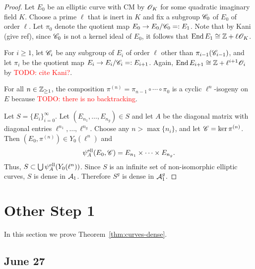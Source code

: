 \documentclass{amsart}
\begin{document}
\begin{proof}
 Let $E_0$ be an elliptic curve with CM by $\mathscr{O}_K$ for some quadratic imaginary field $K$. Choose a prime $\ell$ that is inert in $K$ and fix a subgroup $\mathscr{C}_0$ of $E_0$ of order $\ell$. Let $\pi_0$ denote the quotient map $E_0 \to E_0/\mathscr{C}_0 =: E_1$. Note that by Kani (give ref), since $\mathscr{C}_0$ is not a kernel ideal of $E_0$, it follows that $\operatorname{End} E_1 \cong \mathbb{Z} + \ell\mathscr{O}_K$.

 For $i \ge 1$, let $\mathscr{C}_i$ be any subgroup of $E_i$ of order $\ell$ other than $\pi_{i-1}(\mathscr{C}_{i-1})$, and let $\pi_i$ be the quotient map $E_i \to E_i/\mathscr{C}_i =: E_{i+1}$. Again, $\operatorname{End} E_{i+1} \cong \mathbb{Z} + \ell^{i+1}\mathscr{O}_{i}$ by \textcolor{red}{TODO: cite Kani?}.

 For all $n \in \mathbb{Z}_{\ge 1}$, the composition $\pi^{(n)} = \pi_{n-1} \circ \cdots \circ \pi_0$ is a cyclic $\ell^n$-isogeny on $E$ because \textcolor{red}{TODO: there is no backtracking}.

 Let $S = \{E_i\}_{i=0}^\infty$. Let $(E_{n_1},\dots,E_{n_g}) \in S$ and let $A$ be the diagonal matrix with diagonal entries $\ell^{n_1},\dots,\ell^{n_g}$.  Choose any $n > \max\{n_i\}$, and let $\mathscr{C} = \ker \pi^{(n)}$. Then $(E_0,\pi^{(n)}) \in Y_0(\ell^n)$ and
 \[
   \psi_{A}^\mathrm{ell}(E_0,\mathscr{C}) = E_{n_1} \times \cdots \times E_{n_g}.
 \]
Thus, $S \subset \bigcup\psi_{A}^\mathrm{ell}(Y_0(\ell^n))$. Since $S$ is an infinite set of non-isomorphic elliptic curves, $S$ is dense in $\mathcal{A}_1$. Therefore $S^g$ is dense in $\mathcal{A}_1^g$.
\end{proof}










\newpage

\section{Other Step 1}

In this section we prove Theorem~\ref{thm:curves-dense}.


\subsection{June 27}
\end{document}
